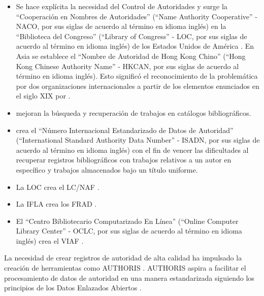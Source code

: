 \begin{itemize}
\item Se hace explícita la necesidad del Control de Autoridades y surge la ``Cooperación en Nombres de Autoridades'' (``Name Authority Cooperative'' - NACO, por sus siglas de acuerdo al término en idioma inglés) en la ``Biblioteca del Congreso'' (``Library of Congress'' - LOC, por sus siglas de acuerdo al término en idioma inglés) de los Estados Unidos de América \citep{Leiva-Mederos2013}. En Asia se establece el ``Nombre de Autoridad de Hong Kong Chino'' (``Hong Kong Chinese Authority Name'' - HKCAN, por sus siglas de acuerdo al término en idioma inglés). Esto significó el reconocimiento de la problemática por dos organizaciones internacionales a partir de los elementos enunciados en el siglo XIX por \cite{cutter1889rules}.

\item \cite{lubetzky1969principles} mejoran la búsqueda y recuperación de trabajos en catálogos bibliográficos.

\item \cite{bregzis1982syndetic} crea el ``Número Internacional Estandarizado de Datos de Autoridad'' (``International Standard Authority Data Number'' - ISADN, por sus siglas de acuerdo al término en idioma inglés) con el fin de vencer las dificultades al recuperar registros bibliográficos con trabajos relativos a un autor en específico y trabajos almacenados bajo un título uniforme.

\item La LOC crea el LC/NAF \citep{Sandberg2016}.

\item La IFLA crea los FRAD \citep{InternationalFederationofLibraryAssociationsandInstitutions2009}.

\item El ``Centro Bibliotecario Computarizado En Línea'' (``Online Computer Library Center'' - OCLC, por sus siglas de acuerdo al término en idioma inglés) crea el VIAF \citep{OCLCOnlineComputerLibraryCenterInc.2014}.
\end{itemize}

La necesidad de crear registros de autoridad de alta calidad ha impulsado la creación de herramientas como AUTHORIS \citep{Leiva-Mederos2013}. AUTHORIS aspira a facilitar el procesamiento de datos de autoridad en una manera estandarizada siguiendo los principios de los Datos Enlazados Abiertos \citep{Berners-Lee2006}.

